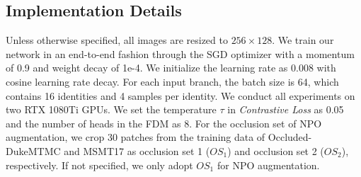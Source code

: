 \documentclass[10pt,twocolumn,letterpaper]{article}
\begin{document}
\subsection{Implementation Details}
Unless otherwise specified, all images are resized to $256 \times 128$. We train our network in an end-to-end fashion through the SGD optimizer with a momentum of 0.9 and weight decay of 1e-4. We initialize the learning rate as 0.008 with cosine learning rate decay. For each input branch, the batch size is 64, which contains 16 identities and 4 samples per identity. We conduct all experiments on two RTX 1080Ti GPUs. We set the temperature $\tau$ in \emph{Contrastive Loss} as 0.05 and the number of heads in the FDM as 8. 
For the occlusion set of NPO augmentation, we crop 30 patches from the training data of Occluded-DukeMTMC and MSMT17 \cite{wei2018person} as occlusion set 1 ($OS_1$) and occlusion set 2 ($OS_2$), respectively. If not specified, we only adopt $OS_1$ for NPO augmentation. 
\end{document}
